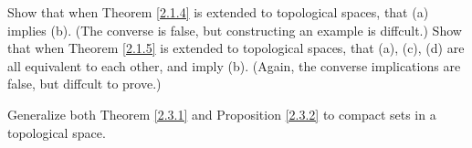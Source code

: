 \begin{exercise}\label{ex 2.5.16}
    Show that when Theorem \ref{2.1.4} is extended to topological spaces, that (a) implies (b).
    (The converse is false, but constructing an example is diffcult.)
    Show that when Theorem \ref{2.1.5} is extended to topological spaces, that (a), (c), (d) are all equivalent to each other, and imply (b).
    (Again, the converse implications are false, but diffcult to prove.)
\end{exercise}

\begin{exercise}\label{ex 2.5.17}
    Generalize both Theorem \ref{2.3.1} and Proposition \ref{2.3.2} to compact sets in a topological space.
\end{exercise}